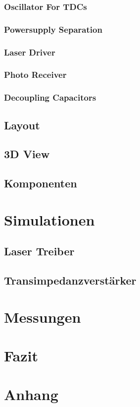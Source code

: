 \documentclass[11pt,a4paper,hidelinks]{article}
\begin{document}
\subsubsection{Oscillator For TDCs}
\subsubsection{Powersupply Separation}
\subsubsection{Laser Driver}
\subsubsection{Photo Receiver}
\subsubsection{Decoupling Capacitors}

\subsection{Layout}
\subsection{3D View}
\subsection{Komponenten}

\section{Simulationen}

\subsection{Laser Treiber}
\subsection{Transimpedanzverstärker}

\section{Messungen}

\section{Fazit}

\section{Anhang}



\end{document}
